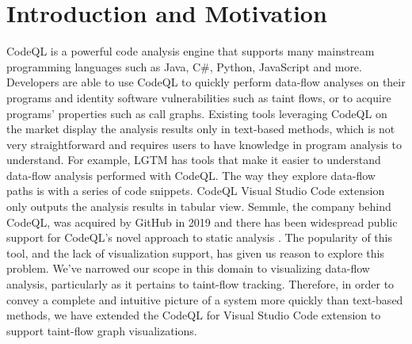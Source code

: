 \documentclass[sigplan,10pt,review]{acmart}
\begin{document}
\section{Introduction and Motivation}
CodeQL is a powerful code analysis engine that supports many mainstream programming languages such as Java, C\#, Python, JavaScript and more. Developers are able to use CodeQL to quickly perform data-flow analyses on their programs and identity software vulnerabilities such as taint flows, or to acquire programs' properties such as call graphs.
\newline
\indent Existing tools leveraging CodeQL on the market display the analysis results only in text-based methods, which is not very straightforward and requires users to have knowledge in program analysis to understand. For example, LGTM has tools that make it easier to understand data-flow analysis performed with CodeQL. The way they explore data-flow paths is with a series of code snippets. CodeQL Visual Studio Code extension only outputs the analysis results in tabular view.
\newline
\indent Semmle, the company behind CodeQL, was acquired by GitHub in 2019 and there has been widespread public support for CodeQL's novel approach to static analysis \cite{Semmle_GitHub}. The popularity of this tool, and the lack of visualization support, has given us reason to explore this problem. We've narrowed our scope in this domain to visualizing data-flow analysis, particularly as it pertains to taint-flow tracking.
\newline
\indent Therefore, in order to convey a complete and intuitive picture of a system more quickly than text-based methods, we have extended the CodeQL for Visual Studio Code extension to support taint-flow graph visualizations.
\end{document}
